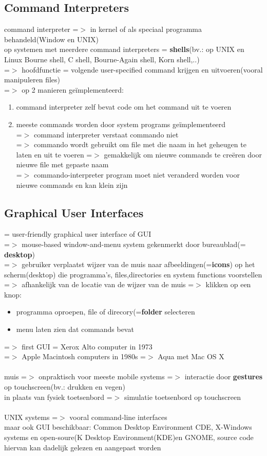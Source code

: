 \documentclass{report}
\begin{document}
\subsection{Command Interpreters}
command interpreter =$>$ in kernel of als speciaal programma behandeld(Window en UNIX)
\\op systemen met meerdere command interpreters = \textbf{shells}(bv.: op UNIX en Linux Bourne shell, C shell, Bourne-Again shell, Korn shell,..)
\\=$>$ hoofdfunctie = volgende user-specified command krijgen en uitvoeren(vooral manipuleren files)
\\=$>$ op 2 manieren ge\"implementeerd:
\begin{enumerate}
\item command interpreter zelf bevat code om het command uit te voeren
\item meeste commands worden door system programs ge\"implementeerd 
\\=$>$ command interpreter verstaat commando niet
\\=$>$ commando wordt gebruikt om file met die naam in het geheugen te laten en uit te voeren =$>$ gemakkelijk om nieuwe commands te cre\"eren door nieuwe file met gepaste naam
\\=$>$ commando-interpreter program moet niet veranderd worden voor nieuwe commands en kan klein zijn
\end{enumerate}
\subsection{Graphical User Interfaces}
= user-friendly graphical user interface of GUI
\\=$>$ mouse-based window-and-menu system gekenmerkt door bureaublad(= \textbf{desktop})
\\=$>$ gebruiker verplaatst wijzer van de muis naar afbeeldingen(=\textbf{icons}) op het scherm(desktop) die programma's, files,directories en system functions voorstellen
\\=$>$ afhankelijk van de locatie van de wijzer van de muis =$>$ klikken op een knop:
\begin{itemize}
\item programma oproepen, file of direcory(=\textbf{folder} selecteren
\item menu laten zien dat commands bevat
\end{itemize}
=$>$ first GUI = Xerox Alto computer in 1973
\\=$>$ Apple Macintosh computers in 1980s =$>$ Aqua met Mac OS X
\\
\\ muis =$>$ onpraktisch voor meeste mobile systems =$>$ interactie door \textbf{gestures} op touchscreen(bv.: drukken en vegen)
\\ in plaats van fysiek toetsenbord =$>$ simulatie toetsenbord op touchscreen
\\
\\UNIX systems =$>$ vooral command-line interfaces
\\maar ook GUI beschikbaar: Common Desktop Environment CDE, X-Windows systems en open-soure(K Desktop Environment(KDE)en GNOME, source code hiervan kan dadelijk gelezen en aangepast worden 
\end{document}
